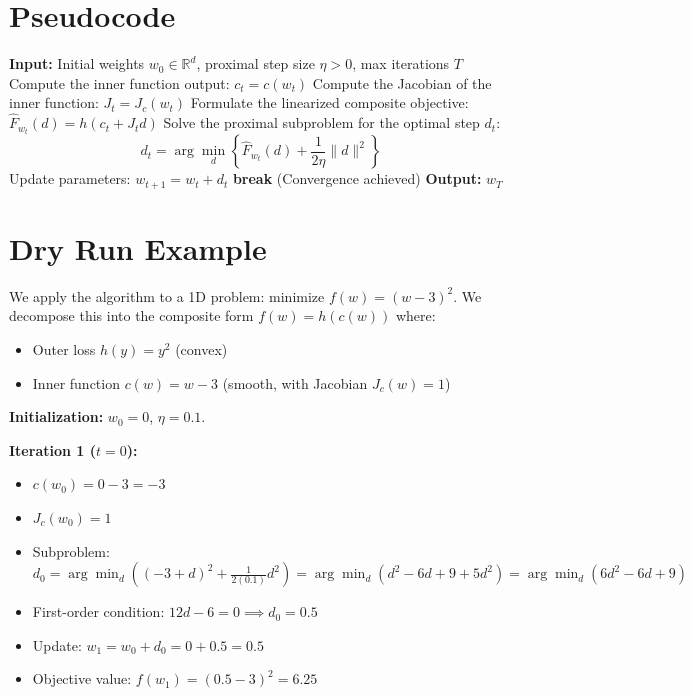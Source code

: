 \documentclass[11pt]{article}
\begin{document}
\section*{Pseudocode}

\begin{algorithm}[H]
\caption{Composite Proximal Linear Algorithm (Deep Frank-Wolfe)}
\begin{algorithmic}[1]
\State \textbf{Input:} Initial weights $w_0 \in \mathbb{R}^d$, proximal step size $\eta > 0$, max iterations $T$
    \State Compute the inner function output: $c_t = c(w_t)$
    \State Compute the Jacobian of the inner function: $J_t = J_c(w_t)$
    \State Formulate the linearized composite objective: 
           $\hat{F}_{w_t}(d) = h(c_t + J_t d)$
    \State Solve the proximal subproblem for the optimal step $d_t$:
           $$d_t = \arg\min_{d} \left\{ \hat{F}_{w_t}(d) + \frac{1}{2\eta} \|d\|^2 \right\}$$
    \State Update parameters: $w_{t+1} = w_t + d_t$
        \State \textbf{break} (Convergence achieved)
    \EndIf
\EndFor
\State \textbf{Output:} $w_T$
\end{algorithmic}
\end{algorithm}

\section*{Dry Run Example}
We apply the algorithm to a 1D problem: minimize $f(w) = (w-3)^2$. 
We decompose this into the composite form $f(w) = h(c(w))$ where:
\begin{itemize}
    \item Outer loss $h(y) = y^2$ (convex)
    \item Inner function $c(w) = w-3$ (smooth, with Jacobian $J_c(w) = 1$)
\end{itemize}
\textbf{Initialization:} $w_0 = 0$, $\eta = 0.1$. 

\textbf{Iteration 1 ($t=0$):}
\begin{itemize}
    \item $c(w_0) = 0 - 3 = -3$
    \item $J_c(w_0) = 1$
    \item Subproblem: $d_0 = \arg\min_d \left( (-3 + d)^2 + \frac{1}{2(0.1)} d^2 \right) = \arg\min_d \left( d^2 - 6d + 9 + 5d^2 \right) = \arg\min_d \left( 6d^2 - 6d + 9 \right)$
    \item First-order condition: $12d - 6 = 0 \implies d_0 = 0.5$
    \item Update: $w_1 = w_0 + d_0 = 0 + 0.5 = 0.5$
    \item Objective value: $f(w_1) = (0.5 - 3)^2 = 6.25$
\end{itemize}
\end{document}
